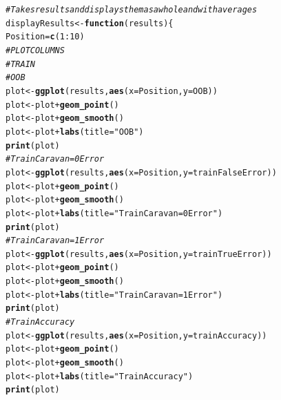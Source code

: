 \documentclass{article}\usepackage[]{graphicx}\usepackage[]{color}
\makeatletter
\newcommand{\hlnum}[1]{\textcolor[rgb]{0.686,0.059,0.569}{#1}}%
\newcommand{\hlstr}[1]{\textcolor[rgb]{0.192,0.494,0.8}{#1}}%
\newcommand{\hlcom}[1]{\textcolor[rgb]{0.678,0.584,0.686}{\textit{#1}}}%
\newcommand{\hlopt}[1]{\textcolor[rgb]{0,0,0}{#1}}%
\newcommand{\hlstd}[1]{\textcolor[rgb]{0.345,0.345,0.345}{#1}}%
\newcommand{\hlkwa}[1]{\textcolor[rgb]{0.161,0.373,0.58}{\textbf{#1}}}%
\newcommand{\hlkwb}[1]{\textcolor[rgb]{0.69,0.353,0.396}{#1}}%
\newcommand{\hlkwc}[1]{\textcolor[rgb]{0.333,0.667,0.333}{#1}}%
\newcommand{\hlkwd}[1]{\textcolor[rgb]{0.737,0.353,0.396}{\textbf{#1}}}%
\newenvironment{kframe}{%
 \def\at@end@of@kframe{}%
 \ifinner\ifhmode%
  \def\at@end@of@kframe{\end{minipage}}%
  \begin{minipage}{\columnwidth}%
 \fi\fi%
 \def\FrameCommand##1{\hskip\@totalleftmargin \hskip-\fboxsep
 \colorbox{shadecolor}{##1}\hskip-\fboxsep
     \hskip-\linewidth \hskip-\@totalleftmargin \hskip\columnwidth}%
 \MakeFramed {\advance\hsize-\width
   \@totalleftmargin\z@ \linewidth\hsize
   \@setminipage}}%
 {\par\unskip\endMakeFramed%
 \at@end@of@kframe}
\newenvironment{knitrout}{}{} %
\makeatother
\begin{document}
\begin{knitrout}
\color{fgcolor}\begin{kframe}
\begin{alltt}
\hlcom{#Takes results and displays them as a whole and with averages }
\hlstd{displayResults}\hlkwb{<-}\hlkwa{function}\hlstd{(}\hlkwc{results}\hlstd{)\{}
  \hlstd{Position}\hlkwb{=}\hlkwd{c}\hlstd{(}\hlnum{1}\hlopt{:}\hlnum{10}\hlstd{)}
  \hlcom{#PLOT COLUMNS}
  \hlcom{#TRAIN}
  \hlcom{#OOB}
  \hlstd{plot}\hlkwb{<-}\hlkwd{ggplot}\hlstd{(results,}\hlkwd{aes}\hlstd{(}\hlkwc{x}\hlstd{=Position,}\hlkwc{y}\hlstd{=OOB))}
  \hlstd{plot}\hlkwb{<-}\hlstd{plot} \hlopt{+} \hlkwd{geom_point}\hlstd{()}
  \hlstd{plot}\hlkwb{<-}\hlstd{plot} \hlopt{+} \hlkwd{geom_smooth}\hlstd{()}
  \hlstd{plot}\hlkwb{<-}\hlstd{plot} \hlopt{+} \hlkwd{labs}\hlstd{(}\hlkwc{title}\hlstd{=}\hlstr{"OOB"}\hlstd{)}
  \hlkwd{print}\hlstd{(plot)}
  \hlcom{#Train Caravan=0 Error}
  \hlstd{plot}\hlkwb{<-}\hlkwd{ggplot}\hlstd{(results,}\hlkwd{aes}\hlstd{(}\hlkwc{x}\hlstd{=Position,}\hlkwc{y}\hlstd{=trainFalseError))}
  \hlstd{plot}\hlkwb{<-}\hlstd{plot} \hlopt{+} \hlkwd{geom_point}\hlstd{()}
  \hlstd{plot}\hlkwb{<-}\hlstd{plot} \hlopt{+} \hlkwd{geom_smooth}\hlstd{()}
  \hlstd{plot}\hlkwb{<-}\hlstd{plot} \hlopt{+} \hlkwd{labs}\hlstd{(}\hlkwc{title}\hlstd{=}\hlstr{"Train Caravan=0 Error"}\hlstd{)}
  \hlkwd{print}\hlstd{(plot)}
  \hlcom{#Train Caravan=1 Error}
  \hlstd{plot}\hlkwb{<-}\hlkwd{ggplot}\hlstd{(results,}\hlkwd{aes}\hlstd{(}\hlkwc{x}\hlstd{=Position,}\hlkwc{y}\hlstd{=trainTrueError))}
  \hlstd{plot}\hlkwb{<-}\hlstd{plot} \hlopt{+} \hlkwd{geom_point}\hlstd{()}
  \hlstd{plot}\hlkwb{<-}\hlstd{plot} \hlopt{+} \hlkwd{geom_smooth}\hlstd{()}
  \hlstd{plot}\hlkwb{<-}\hlstd{plot} \hlopt{+} \hlkwd{labs}\hlstd{(}\hlkwc{title}\hlstd{=}\hlstr{"Train Caravan=1 Error"}\hlstd{)}
  \hlkwd{print}\hlstd{(plot)}
  \hlcom{#Train Accuracy}
  \hlstd{plot}\hlkwb{<-}\hlkwd{ggplot}\hlstd{(results,}\hlkwd{aes}\hlstd{(}\hlkwc{x}\hlstd{=Position,}\hlkwc{y}\hlstd{=trainAccuracy))}
  \hlstd{plot}\hlkwb{<-}\hlstd{plot} \hlopt{+} \hlkwd{geom_point}\hlstd{()}
  \hlstd{plot}\hlkwb{<-}\hlstd{plot} \hlopt{+} \hlkwd{geom_smooth}\hlstd{()}
  \hlstd{plot}\hlkwb{<-}\hlstd{plot} \hlopt{+} \hlkwd{labs}\hlstd{(}\hlkwc{title}\hlstd{=}\hlstr{"Train Accuracy"}\hlstd{)}
  \hlkwd{print}\hlstd{(plot)}


\end{alltt}
\end{kframe}
\end{knitrout}
\end{document}
